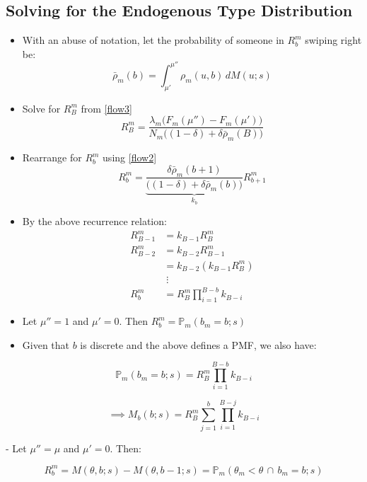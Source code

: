 \subsection{Solving for the Endogenous Type Distribution}
\begin{itemize}
    \item With an abuse of notation, let the probability of someone in $R^m_b$ swiping right be:
    \begin{equation*}
        \bar\rho_m(b)=\int^{\mu''}_{\mu'}\rho_m(u,b)\,dM(u;s) 
    \end{equation*}
    \item Solve for $R^m_B$ from \eqref{flow3}
    \begin{equation*}
        R^m_B= \frac{\lambda_m \Big(F_m(\mu'')-F_m(\mu')\Big)}{N_m\Big((1-\delta)+\delta \bar\rho_m(B)\Big)}
    \end{equation*}
    \item Rearrange for $R^m_b$ using \eqref{flow2}
    \begin{equation*}
        R^m_b=\underbrace{\frac{\delta \bar\rho_m(b+1)}{\Big((1-\delta)+\delta \bar\rho_m(b)\Big)}}_{k_{b}}R^m_{b+1}
    \end{equation*}
    \item By the above recurrence relation:
    \begin{align*}
        R^m_{B-1}&= k_{B-1}R^m_{B}\\
        R^m_{B-2}&= k_{B-2}R^m_{B-1}\\
        &=k_{B-2}(k_{B-1}R^m_{B})\\
         &\;\vdots \\ 
         R^m_{b}&=R^m_{B}\prod^{B-b}_{i=1} k_{B-i}
    \end{align*}
    \item Let $\mu''=1$ and $\mu'=0$. Then $R^m_b = \mathbb{P}_m(b_m=b; s)$
    \item Given that $b$ is discrete and the above defines a PMF, we also have:
\end{itemize}



$$
\mathbb{P}_m(b_m=b;s)=R^m_{B}\prod^{B-b}_{i=1} k_{B-i}
$$



$$
\implies M_b(b;s)=R^m_{B}\sum^b_{j=1}\prod^{B-j}_{i=1} k_{B-i}
$$

- Let $\mu''=\mu$ and $\mu'=0$. Then:

$$
R^m_b=M(\theta,b;s)-M(\theta,b-1;s)=\mathbb{P}_m(\theta_m<\theta \,\cap \, b_m=b;s)
$$

